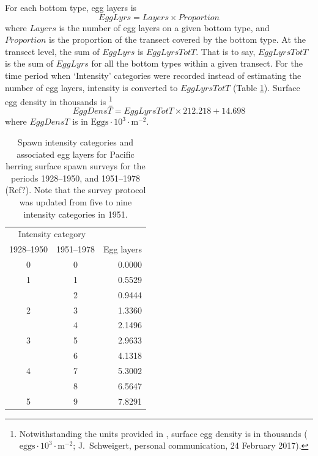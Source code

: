 \documentclass[12pt]{article}
\begin{document}
For each bottom type, egg layers is
\begin{equation}
EggLyrs = Layers \times Proportion
\label{eqEggLayersSurf}
\end{equation}
where $Layers$ is the number of egg layers on a given bottom type, and $Proportion$ is the proportion of the transect covered by the bottom type.
At the transect level, the sum of $EggLyrs$ is $EggLyrsTotT$.
That is to say, $EggLyrsTotT$ is the sum of $EggLyrs$ for all the bottom types within a given transect.
For the time period when `Intensity' categories were recorded instead of estimating the number of egg layers, intensity is converted to $EggLyrsTotT$ (Table \ref{tabIntensity}).
Surface egg density in thousands is \citep{SchweigertEtal1997}%
\footnote{Notwithstanding the units provided in \citet{SchweigertEtal1997}, surface egg density is in thousands ($\text{eggs} \cdot 10^{3} \cdot \text{m}^{-2}$; J.~Schweigert, personal communication, 24 February 2017).}
\begin{equation}
EggDensT = EggLyrsTotT \times 212.218 + 14.698
\label{eqEggDensSurf}
\end{equation}
where $EggDensT$ is in $\text{Eggs} \cdot 10^{3} \cdot \text{m}^{-2}$. 

\begin{table}
\centering
\caption[Spawn intensity categories and associated egg layers for Pacific herring surface spawn surveys]
{Spawn intensity categories and associated egg layers for Pacific herring surface spawn surveys for the periods 1928--1950, and 1951--1978 (Ref?).
Note that the survey protocol was updated from five to nine intensity categories in 1951.}
\begin{tabular}{ccr}
\toprule
\multicolumn{2}{c}{Intensity category} & \\
1928--1950 & 1951--1978 & Egg layers\\
\midrule
0 & 0 & 0.0000 \\
1 & 1 & 0.5529 \\
 & 2 & 0.9444 \\
2 & 3 & 1.3360 \\
 & 4 & 2.1496 \\
3 & 5 & 2.9633 \\
 & 6 & 4.1318 \\
4 & 7 & 5.3002 \\
 & 8 & 6.5647 \\
5 & 9 & 7.8291 \\
\bottomrule
\end{tabular}
\label{tabIntensity}
\end{table}
\end{document}
